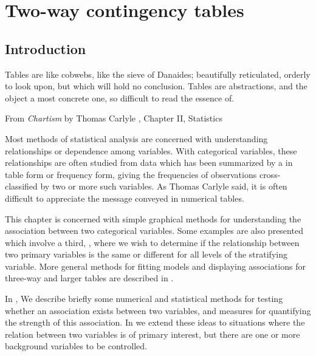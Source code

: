 \documentclass[10pt,krantz2]{krantz}\usepackage[]{graphicx}\usepackage[]{color}
\begin{document}


\chapter{Two-way contingency tables}\label{ch:twoway}


\section{Introduction}\label{sec:twoway-intro}
\epigraph{Tables are like cobwebs, like the
sieve of Danaides; beautifully reticulated, orderly to look upon, but
which will hold no conclusion. Tables are abstractions, and the object a most
concrete one, so difficult to read the essence of.}{From \emph{Chartism} by Thomas Carlyle \citeyearpar{Carlyle:1840}, Chapter II, Statistics}

Most methods of statistical analysis are concerned with understanding
relationships or dependence among variables.
With categorical variables, these relationships are often
studied from data which has been
summarized by a 
in table form or frequency form,
giving the frequencies of observations cross-classified
by two or more such variables. As Thomas Carlyle said, it is often difficult
to appreciate the message conveyed in numerical tables.

This chapter is concerned with simple graphical methods for understanding the association
between two categorical variables.
Some examples are also presented which involve a third, ,
where we wish to determine if the relationship between two primary
variables is the same or different for all levels of the
stratifying variable.
More general methods for fitting models and displaying associations for three-way
and larger tables are described in .

In , We describe briefly some numerical
and statistical
methods for testing whether an association
exists between two variables,  and measures
for quantifying the strength
of this association.
In  we extend these ideas to situations where
the relation between two variables is of primary interest, but there
are one or more background variables to be controlled.
\end{document}
